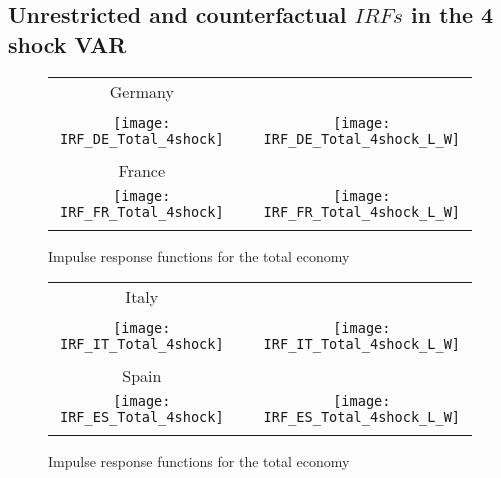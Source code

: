 \documentclass[11pt]{article}
\begin{document}
\begin{appendices}
\clearpage


\section{Unrestricted and counterfactual $IRFs$ in the 4 shock VAR}
\label{AppendixSVAR5}

\begin{figure}[!htb]
\begin{center}
\begin{tabular}{ccc}
Germany &  &  \\
&  &  \\
\texttt{[image: IRF\_DE\_Total\_4shock]} &  & %
\texttt{[image: IRF\_DE\_Total\_4shock\_L\_W]} \\
\\
France &  &  \\
\texttt{[image: IRF\_FR\_Total\_4shock]} &  & %
\texttt{[image: IRF\_FR\_Total\_4shock\_L\_W]} \\
&  &
\end{tabular}
\caption{Impulse response functions for the total economy}
\label{fig: IRFunres}
\end{center}
\end{figure}

\begin{figure}[!htb]
\begin{center}
\begin{tabular}{ccc}
Italy &  &  \\
&  &  \\
\texttt{[image: IRF\_IT\_Total\_4shock]} &  & %
\texttt{[image: IRF\_IT\_Total\_4shock\_L\_W]} \\
\\
Spain &  &  \\
\texttt{[image: IRF\_ES\_Total\_4shock]} &  & %
\texttt{[image: IRF\_ES\_Total\_4shock\_L\_W]} \\
&  &
\end{tabular}
\caption{Impulse response functions for the total economy}
\label{fig: IRFunres}
\end{center}
\end{figure}


\end{appendices}
\end{document}
